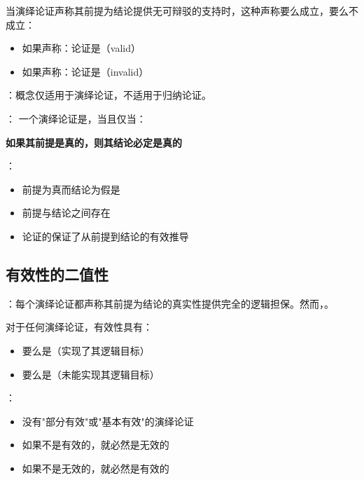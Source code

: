 当演绎论证声称其前提为结论提供无可辩驳的支持时，这种声称要么成立，要么不成立：
\begin{itemize}
  \item 如果声称：论证是（valid）
  \item 如果声称：论证是（invalid）
\end{itemize}

\begin{theorembox}[title=有效性的精确定义]
：概念仅适用于演绎论证，不适用于归纳论证。

：
一个演绎论证是，当且仅当：
\begin{center}
\textbf{如果其前提是真的，则其结论必定是真的}
\end{center}

：
\begin{itemize}
  \item 前提为真而结论为假是
  \item 前提与结论之间存在
  \item 论证的保证了从前提到结论的有效推导
\end{itemize}
\end{theorembox}

\subsection{有效性的二值性}

：每个演绎论证都声称其前提为结论的真实性提供完全的逻辑担保。然而，。

\begin{theorembox}[title=有效性的二值原理]
对于任何演绎论证，有效性具有：
\begin{itemize}
  \item 要么是（实现了其逻辑目标）
  \item 要么是（未能实现其逻辑目标）
\end{itemize}

：
\begin{itemize}
  \item 没有"部分有效"或"基本有效"的演绎论证
  \item 如果不是有效的，就必然是无效的
  \item 如果不是无效的，就必然是有效的
\end{itemize}
\end{theorembox}

